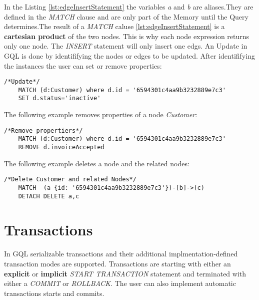 In the Listing \ref{lst:edgeInsertStatement} the variables \textit{a} and \textit{b} are
aliases.\newline They are defined in the \textit{MATCH} clause and are only part of the Memory until
the Query determines.\newline The result of a \textit{MATCH} caluse \ref{lst:edgeInsertStatement} is a \textbf{cartesian product} of the two nodes.
This is why each node expression returns only one node. The \textit{INSERT} statement will only insert one edgs.\newline
An Update in GQL is done by identififying the nodes or edges to be updated.
After identififying the instances the user can set or remove properties:
\begin{lstlisting}[caption={Update statements in GQL}, label={lst:updateStatement}] 
	/*Update*/
	MATCH (d:Customer) where d.id = '6594301c4aa9b3232889e7c3'
	SET d.status='inactive'
\end{lstlisting}
The following example removes properties of a node \textit{Customer}:
\begin{lstlisting}[caption={Delete propteries in GQL}, label={lst:removeStatement}] 
	/*Remove propertiers*/
	MATCH (d:Customer) where d.id = '6594301c4aa9b3232889e7c3'
	REMOVE d.invoiceAccepted
\end{lstlisting}
The following example deletes a node and the related nodes:
\begin{lstlisting}[caption={Remove nodes and in GQL}, label={lst:deleteStatement}] 
	/*Delete Customer and related Nodes*/
	MATCH  (a {id: '6594301c4aa9b3232889e7c3'})-[b]->(c)
	DETACH DELETE a,c
\end{lstlisting}
\section{Transactions}
In GQL serializable transactions and their additional implmentation-defined transaction modes 
are supported.
Transactions are starting with either an \textbf{explicit} or \textbf{implicit} \textit{START TRANSACTION}
statement and terminated with either a \textit{COMMIT} or \textit{ROLLBACK}.
The user can also  implement automatic transactions starts and commits.



